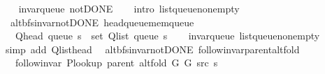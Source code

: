 \begin{isabellebody}
%
\endisadeliminvisible
%
\isadelimproof
\ \ %
\endisadelimproof
%
\isatagproof
{}\isamarkupfalse%
\ invar{\isacharunderscore}{\kern0pt}queue\ not{\isacharunderscore}{\kern0pt}DONE\isanewline
\ \ \isamarkupfalse%
\ {\isacharparenleft}{\kern0pt}intro\ list{\isacharunderscore}{\kern0pt}queue{\isacharunderscore}{\kern0pt}non{\isacharunderscore}{\kern0pt}empty{\isacharparenright}{\kern0pt}%
\endisatagproof
{\isafoldproof}%
%
\isadelimproof
\isanewline
%
\endisadelimproof
%
\isadeliminvisible
\isanewline
%
\endisadeliminvisible
%
\isataginvisible
{}\isamarkupfalse%
\ {\isacharparenleft}{\kern0pt}\ alt{\isacharunderscore}{\kern0pt}bfs{\isacharunderscore}{\kern0pt}invar{\isacharunderscore}{\kern0pt}not{\isacharunderscore}{\kern0pt}DONE{\isacharparenright}{\kern0pt}\ head{\isacharunderscore}{\kern0pt}queue{\isacharunderscore}{\kern0pt}mem{\isacharunderscore}{\kern0pt}queue{\isacharcolon}{\kern0pt}\isanewline
\ \ \ {\isachardoublequoteopen}Q{\isacharunderscore}{\kern0pt}head\ {\isacharparenleft}{\kern0pt}queue\ s{\isacharparenright}{\kern0pt}\ {\isasymin}\ set\ {\isacharparenleft}{\kern0pt}Q{\isacharunderscore}{\kern0pt}list\ {\isacharparenleft}{\kern0pt}queue\ s{\isacharparenright}{\kern0pt}{\isacharparenright}{\kern0pt}{\isachardoublequoteclose}%
\endisataginvisible
{\isafoldinvisible}%
%
\isadeliminvisible
\isanewline
%
\endisadeliminvisible
%
\isadelimproof
\ \ %
\endisadelimproof
%
\isatagproof
{}\isamarkupfalse%
\ invar{\isacharunderscore}{\kern0pt}queue\ list{\isacharunderscore}{\kern0pt}queue{\isacharunderscore}{\kern0pt}non{\isacharunderscore}{\kern0pt}empty\isanewline
\ \ \isamarkupfalse%
\ {\isacharparenleft}{\kern0pt}simp\ add{\isacharcolon}{\kern0pt}\ Q{\isachardot}{\kern0pt}list{\isacharunderscore}{\kern0pt}head{\isacharparenright}{\kern0pt}%
\endisatagproof
{\isafoldproof}%
%
\isadelimproof
\isanewline
%
\endisadelimproof
\isanewline
{}\isamarkupfalse%
\ {\isacharparenleft}{\kern0pt}\ alt{\isacharunderscore}{\kern0pt}bfs{\isacharunderscore}{\kern0pt}invar{\isacharunderscore}{\kern0pt}not{\isacharunderscore}{\kern0pt}DONE{\isacharparenright}{\kern0pt}\ follow{\isacharunderscore}{\kern0pt}invar{\isacharunderscore}{\kern0pt}parent{\isacharunderscore}{\kern0pt}alt{\isacharunderscore}{\kern0pt}fold{\isacharcolon}{\kern0pt}\isanewline
\ \ \ {\isachardoublequoteopen}follow{\isacharunderscore}{\kern0pt}invar\ {\isacharparenleft}{\kern0pt}P{\isacharunderscore}{\kern0pt}lookup\ {\isacharparenleft}{\kern0pt}parent\ {\isacharparenleft}{\kern0pt}alt{\isacharunderscore}{\kern0pt}fold\ G{}\ G{}\ src\ s{\isacharparenright}{\kern0pt}{\isacharparenright}{\kern0pt}{\isacharparenright}{\kern0pt}{\isachardoublequoteclose}\isanewline

\end{isabellebody}
